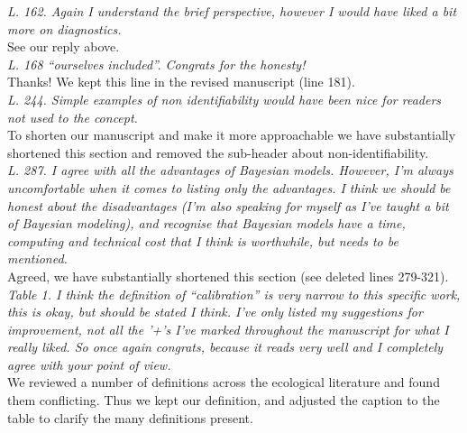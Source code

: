\documentclass[11pt,a4paper]{article}
\begin{document}
\emph{L. 162. Again I understand the brief perspective, however I would have liked a bit more on diagnostics.} \\

See our reply above.\\

\emph{L. 168 “ourselves included”. Congrats for the honesty!}\\

Thanks! We kept this line in the revised manuscript (line 181). \\

\emph{L. 244. Simple examples of non identifiability would have been nice for readers not used to the concept.}\\

To shorten our manuscript and make it more approachable we have substantially shortened this section and removed the sub-header about non-identifiability. \\

\emph{L. 287. I agree with all the advantages of Bayesian models. However, I'm always uncomfortable when it comes to listing only the advantages. I think we should be honest about the disadvantages (I'm also speaking for myself as I've taught a bit of Bayesian modeling), and recognise that Bayesian models have a time, computing and technical cost that I think is worthwhile, but needs to be mentioned.}\\

Agreed, we have substantially shortened this section (see deleted lines 279-321).\\

\emph{Table 1. I think the definition of “calibration” is very narrow to this specific work, this is okay, but should be stated I think.
I've only listed my suggestions for improvement, not all the '+'s I've marked throughout the manuscript for what I really liked. So once again congrats, because it reads very well and I completely agree with your point of view.}\\

We reviewed a number of definitions across the ecological literature and found them conflicting. Thus we kept our definition, and adjusted the caption to the table to clarify the many definitions present. 



\end{document}
